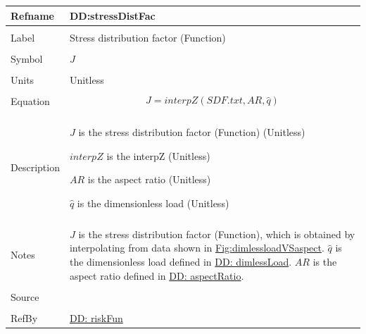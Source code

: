 \documentclass[12pt]{article}
\begin{document}
\noindent \begin{minipage}{\textwidth}
\begin{tabular}{p{} p{}}
\toprule \textbf{Refname} & \textbf{DD:stressDistFac}
\label{DD:stressDistFac}
\\ \midrule \\
Label & Stress distribution factor (Function)
\\ \midrule \\
Symbol & $J$
\\ \midrule \\
Units & Unitless
\\ \midrule \\
Equation & \begin{displaymath}
           J=interpZ\left(SDF.txt,AR,\hat{q}\right)
           \end{displaymath}
\\ \midrule \\
Description & \begin{symbDescription}
              \item{$J$ is the stress distribution factor (Function) (Unitless)}
              \item{$interpZ$ is the interpZ (Unitless)}
              \item{$AR$ is the aspect ratio (Unitless)}
              \item{$\hat{q}$ is the dimensionless load (Unitless)}
              \end{symbDescription}
\\ \midrule \\
Notes & $J$ is the stress distribution factor (Function), which is obtained by interpolating from data shown in \hyperref[Figure:dimlessloadVSaspect]{Fig:dimlessloadVSaspect}.
        $\hat{q}$ is the dimensionless load defined in \hyperref[DD:dimlessLoad]{DD: dimlessLoad}.
        $AR$ is the aspect ratio defined in \hyperref[DD:aspectRatio]{DD: aspectRatio}.
\\ \midrule \\
Source & \cite{astm2009}
\\ \midrule \\
RefBy & \hyperref[DD:riskFun]{DD: riskFun}
\\ \bottomrule \end{tabular}
\end{minipage}
\par~
\end{document}

